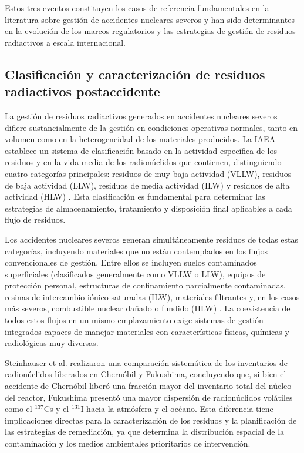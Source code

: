 Estos tres eventos constituyen los casos de referencia fundamentales en la
literatura sobre gestión de accidentes nucleares severos y han sido determinantes
en la evolución de los marcos regulatorios y las estrategias de gestión de
residuos radiactivos a escala internacional.

\subsection{Clasificación y caracterización de residuos radiactivos postaccidente}

La gestión de residuos radiactivos generados en accidentes nucleares severos
difiere sustancialmente de la gestión en condiciones operativas normales, tanto
en volumen como en la heterogeneidad de los materiales producidos. La IAEA
establece un sistema de clasificación basado en la actividad específica de los
residuos y en la vida media de los radionúclidos que contienen, distinguiendo
cuatro categorías principales: residuos de muy baja actividad (VLLW), residuos
de baja actividad (LLW), residuos de media actividad (ILW) y residuos de alta
actividad (HLW) \cite{IAEAGSG12009}. Esta clasificación es fundamental para
determinar las estrategias de almacenamiento, tratamiento y disposición final
aplicables a cada flujo de residuos.

Los accidentes nucleares severos generan simultáneamente residuos de todas estas
categorías, incluyendo materiales que no están contemplados en los flujos
convencionales de gestión. Entre ellos se incluyen suelos contaminados superficiales
(clasificados generalmente como VLLW o LLW), equipos de protección personal,
estructuras de confinamiento parcialmente contaminadas, resinas de intercambio
iónico saturadas (ILW), materiales filtrantes y, en los casos más severos,
combustible nuclear dañado o fundido (HLW) \cite{IAEAGSG12009, Ojovan2011}.
La coexistencia de todos estos flujos en un mismo emplazamiento exige sistemas de
gestión integrados capaces de manejar materiales con características físicas,
químicas y radiológicas muy diversas.

Steinhauser et al. \cite{Steinhauser2014} realizaron una comparación sistemática
de los inventarios de radionúclidos liberados en Chernóbil y Fukushima, concluyendo
que, si bien el accidente de Chernóbil liberó una fracción mayor del inventario
total del núcleo del reactor, Fukushima presentó una mayor dispersión de
radionúclidos volátiles como el $^{137}$Cs y el $^{131}$I hacia la atmósfera y
el océano. Esta diferencia tiene implicaciones directas para la caracterización de
los residuos y la planificación de las estrategias de remediación, ya que
determina la distribución espacial de la contaminación y los medios ambientales
prioritarios de intervención.

